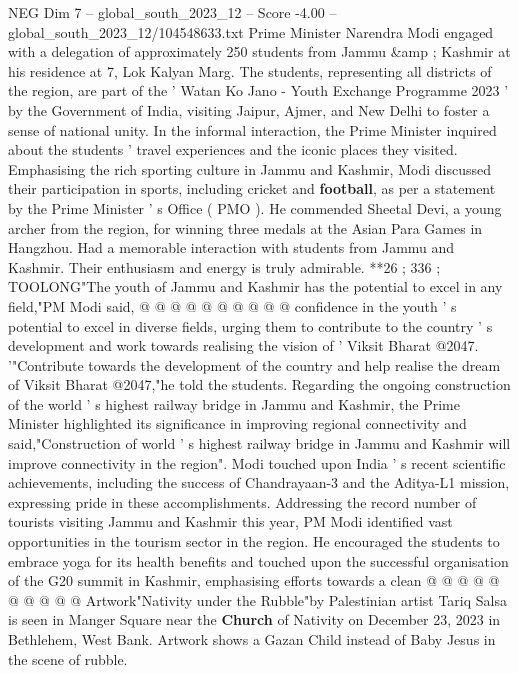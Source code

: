 \begin{textsample}{NEG Dim 7 – global\_south\_2023\_12 – Score -4.00 – global\_south\_2023\_12/104548633.txt}  \label{ex:f7_neg_420}
Prime Minister Narendra Modi engaged with a delegation of approximately 250 students from Jammu \&amp ; Kashmir at his residence at 7, Lok Kalyan Marg.
The students, representing all districts of the region, are part of the ' Watan Ko Jano - Youth Exchange Programme 2023 ' by the Government of India, visiting Jaipur, Ajmer, and New Delhi to foster a sense of national unity.
In the informal interaction, the Prime Minister inquired about the students ' travel experiences and the iconic places they visited.
Emphasising the rich sporting culture in Jammu and Kashmir, Modi discussed their participation in sports, including cricket and \textbf{football}, as per a statement by the Prime Minister ' s Office ( PMO ).
He commended Sheetal Devi, a young archer from the region, for winning three medals at the Asian Para Games in Hangzhou.
Had a memorable interaction with students from Jammu and Kashmir.
Their enthusiasm and energy is truly admirable. **26 ; 336 ; TOOLONG"The youth of Jammu and Kashmir has the potential to excel in any field,"PM Modi said, @ @ @ @ @ @ @ @ @ @ confidence in the youth ' s potential to excel in diverse fields, urging them to contribute to the country ' s development and work towards realising the vision of ' Viksit Bharat @2047. '"Contribute towards the development of the country and help realise the dream of Viksit Bharat @2047,"he told the students.
Regarding the ongoing construction of the world ' s highest railway bridge in Jammu and Kashmir, the Prime Minister highlighted its significance in improving regional connectivity and said,"Construction of world ' s highest railway bridge in Jammu and Kashmir will improve connectivity in the region".
Modi touched upon India ' s recent scientific achievements, including the success of Chandrayaan-3 and the Aditya-L1 mission, expressing pride in these accomplishments.
Addressing the record number of tourists visiting Jammu and Kashmir this year, PM Modi identified vast opportunities in the tourism sector in the region.
He encouraged the students to embrace yoga for its health benefits and touched upon the successful organisation of the G20 summit in Kashmir, emphasising efforts towards a clean @ @ @ @ @ @ @ @ @ @ Artwork"Nativity under the Rubble"by Palestinian artist Tariq Salsa is seen in Manger Square near the \textbf{Church} of Nativity on December 23, 2023 in Bethlehem, West Bank.
Artwork shows a Gazan Child instead of Baby Jesus in the scene of rubble.

\end{textsample}
